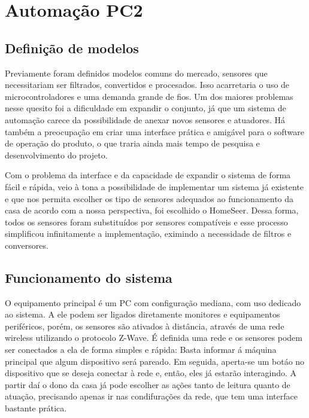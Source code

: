 \chapter{Automação PC2}
\section{Definição de modelos}

	Previamente foram definidos modelos comuns do mercado, sensores que necessitariam ser filtrados, convertidos e procesados. Isso acarretaria o uso de microcontroladores e uma demanda grande de fios. Um dos maiores problemas nesse quesito foi a dificuldade em expandir o conjunto, já que um sistema de automação carece da possibilidade de anexar novos sensores e atuadores. Há também a preocupação em criar uma interface prática e amigável para o software de operação do produto, o que traria ainda mais tempo de pesquisa e desenvolvimento do projeto.  

	Com o problema da interface e da capacidade de expandir o sistema de forma fácil e rápida, veio à tona a possibilidade de implementar um sistema já existente e que nos permita escolher os tipo de sensores adequados ao funcionamento da casa de acordo com a nossa perspectiva, foi escolhido o HomeSeer. Dessa forma, todos os sensores foram substituídos por sensores compatíveis e esse processo simplificou infinitamente a implementação, eximindo a necessidade de filtros e conversores. 

\section{Funcionamento do sistema}

	O equipamento principal é um PC com configuração mediana, com uso dedicado ao sistema. A ele podem ser ligados diretamente monitores e equipamentos periféricos, porém, os sensores são ativados à distância, através de uma rede wireless utilizando o protocolo Z-Wave. É definida uma rede e os sensores podem ser conectados a ela de forma simples e rápida: Basta informar á máquina principal que algum dispositivo será pareado. Em seguida, aperta-se um botáo no dispositivo que se deseja conectar à rede e, então, eles já estarão interagindo.  A partir daí o dono da casa já pode escolher as ações tanto de leitura quanto de atuação, precisando apenas ir nas condifurações da rede, que tem uma interface bastante prática.

